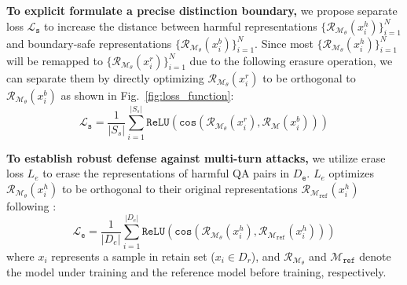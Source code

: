\textbf{To explicit formulate a precise distinction boundary,} we propose separate loss $\mathcal{L}_\texttt{s}$ to increase the distance between harmful representations $\{\mathcal{R}_{\mathcal{M}_\theta} \left(x_i^h \right)\}_{i=1}^N$ and boundary-safe representations $\{\mathcal{R}_{\mathcal{M}_\theta} \left(x_i^b \right)\}_{i=1}^N$.
%
Since most $\{\mathcal{R}_{\mathcal{M}_\theta} \left(x_i^h \right)\}_{i=1}^N$ will be remapped to $\{\mathcal{R}_{\mathcal{M}_\theta} \left(x_i^r \right)\}_{i=1}^N$ due to the following erasure operation, we can separate them by directly optimizing $\mathcal{R}_{\mathcal{M}_\theta}\left(x_i^r \right)$ to be orthogonal to $\mathcal{R}_{\mathcal{M}_\theta}\left(x_i^b \right)$ as shown in Fig.~\ref{fig:loss_function}:
\begin{equation}
    \mathcal{L}_\texttt{s} = \frac{1}{\left|S_s\right|}\sum_{i=1}^{\left|S_s\right|}\texttt{ReLU} \left(\texttt{cos}\left(\mathcal{R}_{\mathcal{M}_\theta} \left(x_i^r \right), \mathcal{R}_\mathcal{M} \left(x_i^b \right) \right) \right) 
\end{equation}

\textbf{To establish robust defense against multi-turn attacks,} we utilize erase loss $L_{e}$ to erase the representations of harmful QA pairs in $D_\texttt{e}$.
% 
$L_{e}$ optimizes $\mathcal{R}_{\mathcal{M}_{\theta}} \left(x_i^h \right)$ to be orthogonal to their original representations $\mathcal{R}_{\mathcal{M}_{\texttt{ref}}} \left(x_i^h \right)$ following \cite{circuit_breaker}:
\begin{equation}
    \mathcal{L}_\texttt{e} =\frac{1}{\left|D_e\right|}\sum_{i=1}^{\left|D_e\right|}\texttt{ReLU} \left(\texttt{cos}\left(\mathcal{R}_{\mathcal{M}_{\theta}} \left(x_i^h \right), \mathcal{R}_{\mathcal{M}_{\texttt{ref}}} \left(x_i^h \right)\right) \right) 
\end{equation}
where $x_i$ represents a sample in retain set ($x_i \in D_r$), and $\mathcal{R}_{\mathcal{M}_{\theta}}$ and $\mathcal{M}_{\texttt{ref}}$ denote the model under training and the reference model before training, respectively.
%

